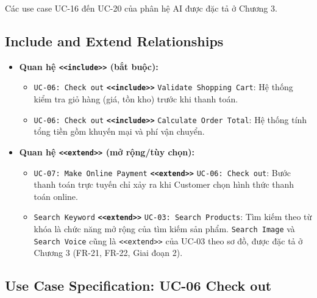 \documentclass[12pt,a4paper,oneside]{report}
\begin{document}
Các use case UC-16 đến UC-20 của phân hệ AI được đặc tả ở Chương 3.

\subsection{Include and Extend Relationships}

\begin{itemize}
  \item \textbf{Quan hệ \texttt{<<include>>} (bắt buộc):}
  \begin{itemize}
    \item \texttt{UC-06: Check out} \textbf{\texttt{<<include>>}} \texttt{Validate Shopping Cart}: Hệ thống kiểm tra giỏ hàng (giá, tồn kho) trước khi thanh toán.
    \item \texttt{UC-06: Check out} \textbf{\texttt{<<include>>}} \texttt{Calculate Order Total}: Hệ thống tính tổng tiền gồm khuyến mại và phí vận chuyển.
  \end{itemize}
  \item \textbf{Quan hệ \texttt{<<extend>>} (mở rộng/tùy chọn):}
  \begin{itemize}
    \item \texttt{UC-07: Make Online Payment} \textbf{\texttt{<<extend>>}} \texttt{UC-06: Check out}: Bước thanh toán trực tuyến chỉ xảy ra khi Customer chọn hình thức thanh toán online.
    \item \texttt{Search Keyword} \textbf{\texttt{<<extend>>}} \texttt{UC-03: Search Products}: Tìm kiếm theo từ khóa là chức năng mở rộng của tìm kiếm sản phẩm. \texttt{Search Image} và \texttt{Search Voice} cũng là \texttt{<<extend>>} của UC-03 theo sơ đồ, được đặc tả ở Chương 3 (FR-21, FR-22, Giai đoạn 2).
  \end{itemize}
\end{itemize}


\subsection{Use Case Specification: UC-06 Check out}
\end{document}
